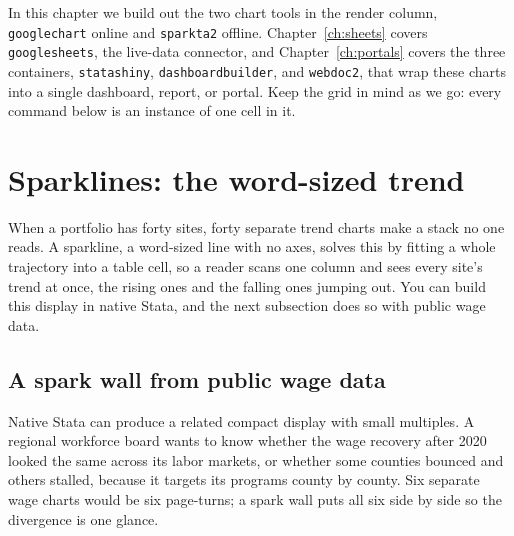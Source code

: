 In this chapter we build out the two chart tools in the render column, \texttt{googlechart} online and \texttt{sparkta2} offline. Chapter~\ref{ch:sheets} covers \texttt{googlesheets}, the live-data connector, and Chapter~\ref{ch:portals} covers the three containers, \texttt{statashiny}, \texttt{dashboardbuilder}, and \texttt{webdoc2}, that wrap these charts into a single dashboard, report, or portal. Keep the grid in mind as we go: every command below is an instance of one cell in it.

\section{Sparklines: the word-sized trend}
When a portfolio has forty sites, forty separate trend charts make a stack no one reads. A sparkline, a word-sized line with no axes, solves this by fitting a whole trajectory into a table cell, so a reader scans one column and sees every site's trend at once, the rising ones and the falling ones jumping out. You can build this display in native Stata, and the next subsection does so with public wage data.

\subsection{A spark wall from public wage data}\label{sec:sparkwall}
Native Stata can produce a related compact display with small multiples. A regional workforce board wants to know whether the wage recovery after 2020 looked the same across its labor markets, or whether some counties bounced and others stalled, because it targets its programs county by county. Six separate wage charts would be six page-turns; a spark wall puts all six side by side so the divergence is one glance.

